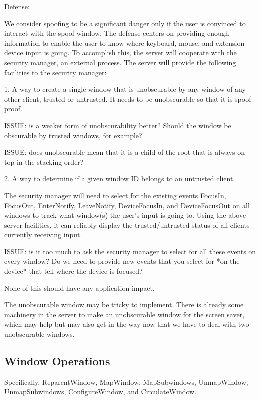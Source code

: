 \documentclass{article}
\begin{document}
Defense:

We consider spoofing to be a significant danger only if the user is
convinced to interact with the spoof window.  The defense centers on
providing enough information to enable the user to know where
keyboard, mouse, and extension device input is going.  To accomplish
this, the server will cooperate with the security manager, an external
process.  The server will provide the following facilities to the
security manager:

1.  A way to create a single window that is unobscurable by any window
of any other client, trusted or untrusted.  It needs to be
unobscurable so that it is spoof-proof.

ISSUE: is a weaker form of unobscurability better?  Should the window be
obscurable by trusted windows, for example?

ISSUE: does unobscurable mean that it is a child of the root that is
always on top in the stacking order?

2.  A way to determine if a given window ID belongs to an untrusted
client.

The security manager will need to select for the existing events
FocusIn, FocusOut, EnterNotify, LeaveNotify, DeviceFocusIn, and
DeviceFocusOut on all windows to track what window(s) the user's input
is going to.  Using the above server facilities, it can reliably
display the trusted/untrusted status of all clients currently
receiving input.

ISSUE: is it too much to ask the security manager to select for all
these events on every window?  Do we need to provide new events that
you select for *on the device* that tell where the device is focused?

None of this should have any application impact.

The unobscurable window may be tricky to implement.  There is already
some machinery in the server to make an unobscurable window for the
screen saver, which may help but may also get in the way now that we
have to deal with two unobscurable windows.



\subsection{Window Operations}

Specifically, ReparentWindow, MapWindow, MapSubwindows, UnmapWindow,
UnmapSubwindows, ConfigureWindow, and CirculateWindow.
\end{document}
